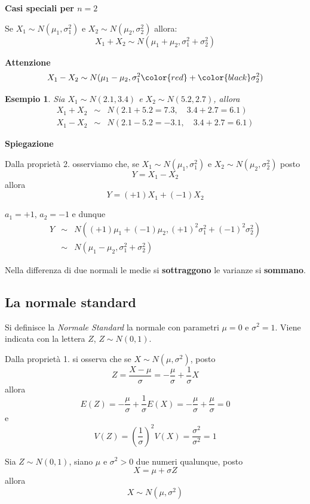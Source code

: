 \documentclass[
  11pt,
]{book}
\theoremstyle{mytheoremstyle}
\theoremstyle{mydefstyle}
\newtheorem{example}{{Esempio}}[section]
\newenvironment{att}
  {
\begin{tcolorbox}[enhanced,arc=0.1mm,boxrule=1pt,colback=white,colframe=ared,title=\bf\small \fontfamily{lmss}\selectfont \faExclamationTriangle \hspace{.5 cm} Attenzione,drop fuzzy shadow]
}{
\end{tcolorbox}
  }
\begin{document}
\textbf{Casi speciali per \(n=2\) }

Se \(X_1\sim N(\mu_1,\sigma^2_1)\) e \(X_2\sim N(\mu_2,\sigma^2_2)\) allora:
\[X_1+X_2\sim N(\mu_1+\mu_2,\sigma^2_1+\sigma^2_2)\]

\begin{att}
\textbf{Attenzione}
\[X_1-X_2\sim N(\mu_1-\mu_2,\sigma^2_1\color{red}+\color{black}\sigma^2_2)\]

\end{att}

\begin{example}
Sia \(X_1\sim N(2.1,3.4)\) e \(X_2\sim N(5.2,2.7)\), allora
\begin{eqnarray*}
  X_1 + X_2 &\sim& N(2.1+5.2=7.3,\quad 3.4+2.7=6.1)\\
  X_1 - X_2 &\sim& N(2.1-5.2=-3.1,\quad 3.4+2.7=6.1)
\end{eqnarray*}
\end{example}

\textbf{Spiegazione}

Dalla proprietà 2. osserviamo che, se \(X_1\sim N(\mu_1,\sigma_1^2)\) e \(X_2\sim N(\mu_2,\sigma_2^2)\)
posto
\[Y=X_1-X_2\]
allora
\[Y = (+1)X_1+(-1)X_2\]

\(a_1= +1\), \(a_2= -1\) e dunque
\begin{eqnarray*}
  Y &\sim& N((+1)\mu_1+(-1)\mu_2,(+1)^2\sigma_1^2+(-1)^2\sigma_2^2)\\
    &\sim& N(\mu_1-\mu_2,\sigma_1^2+\sigma_2^2)
\end{eqnarray*}

Nella differenza di due normali le medie si \textbf{sottraggono} le varianze si \textbf{sommano}.

\subsection{La normale standard}\label{la-normale-standard}

Si definisce la \emph{Normale Standard} la normale con parametri \(\mu=0\) e \(\sigma^2=1\). Viene indicata con la lettera \(Z\), \(Z\sim N(0,1)\).

Dalla proprietà 1. si osserva che se \(X\sim N(\mu,\sigma^2)\), posto
\[Z=\frac {X-\mu}\sigma= -\frac\mu\sigma+\frac 1 \sigma X\]
allora
\[E(Z) = -\frac\mu\sigma+\frac 1 \sigma E(X)= -\frac\mu\sigma+\frac \mu \sigma =0\]
e
\[V(Z)=\left(\frac 1 \sigma \right)^2V(X)=\frac {\sigma^2 }{\sigma^2}=1\]

Sia \(Z\sim N(0,1)\), siano \(\mu\) e \(\sigma^2>0\) due numeri qualunque, posto
\[X=\mu+\sigma Z\]
allora
\[X\sim N(\mu,\sigma^2)\]
\end{document}
